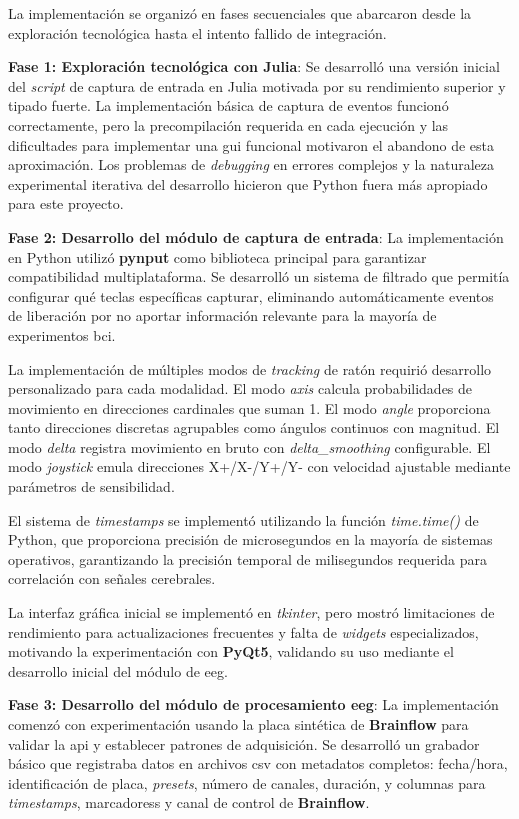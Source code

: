 La implementación se organizó en fases secuenciales que abarcaron desde la exploración tecnológica hasta el intento fallido de integración.

\textbf{Fase 1: Exploración tecnológica con Julia}:
Se desarrolló una versión inicial del \textit{script} de captura de entrada en Julia motivada por su rendimiento superior y tipado fuerte. La implementación básica de captura de eventos funcionó correctamente, pero la precompilación requerida en cada ejecución y las dificultades para implementar una \acrshort{gui} funcional motivaron el abandono de esta aproximación. Los problemas de \textit{debugging} en errores complejos y la naturaleza experimental iterativa del desarrollo hicieron que Python fuera más apropiado para este proyecto.

\textbf{Fase 2: Desarrollo del módulo de captura de entrada}:
La implementación en Python utilizó \textbf{pynput} como biblioteca principal para garantizar compatibilidad multiplataforma. Se desarrolló un sistema de filtrado que permitía configurar qué teclas específicas capturar, eliminando automáticamente eventos de liberación por no aportar información relevante para la mayoría de experimentos \acrshort{bci}.

La implementación de múltiples modos de \textit{tracking} de ratón requirió desarrollo personalizado para cada modalidad. El modo \textit{axis} calcula probabilidades de movimiento en direcciones cardinales que suman 1. El modo \textit{angle} proporciona tanto direcciones discretas agrupables como ángulos continuos con magnitud. El modo \textit{delta} registra movimiento en bruto con \textit{\gls{delta_smoothing}} configurable. El modo \textit{joystick} emula direcciones X+/X-/Y+/Y- con velocidad ajustable mediante parámetros de sensibilidad.

El sistema de \textit{\glspl{timestamp}} se implementó utilizando la función \textit{time.time()} de Python, que proporciona precisión de microsegundos en la mayoría de sistemas operativos, garantizando la precisión temporal de milisegundos requerida para correlación con señales cerebrales.

La interfaz gráfica inicial se implementó en \textit{tkinter}, pero mostró limitaciones de rendimiento para actualizaciones frecuentes y falta de \textit{\glspl{widget}} especializados, motivando la experimentación con \textbf{PyQt5}, validando su uso mediante el desarrollo inicial del módulo de \acrshort{eeg}.

\textbf{Fase 3: Desarrollo del módulo de procesamiento \acrshort{eeg}}:
La implementación comenzó con experimentación usando la placa sintética de \textbf{Brainflow} para validar la \acrshort{api} y establecer patrones de adquisición. Se desarrolló un grabador básico que registraba datos en archivos \acrshort{csv} con metadatos completos: fecha/hora, identificación de placa, \textit{\glspl{preset}}, número de canales, duración, y columnas para \textit{\glspl{timestamp}}, \glspl{marcadores} y canal de control de \textbf{Brainflow}.

